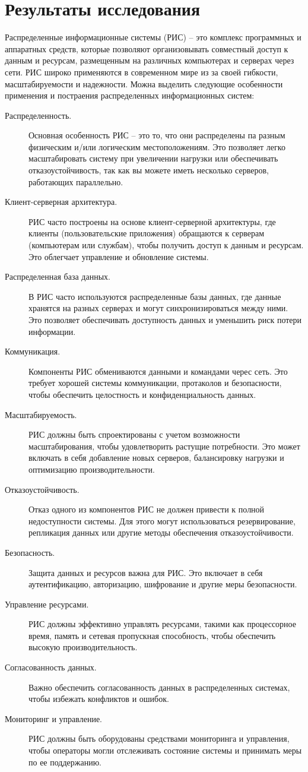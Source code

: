 \documentclass[report, draught]{fefudoc}
\begin{document}
\section{Результаты исследования}
Распределенные информационные системы (РИС) – это комплекс программных и аппаратных средств, которые позволяют организовывать совместный доступ к данным и ресурсам, размещенным на различных компьютерах и серверах через сети. РИС широко применяются в современном мире из за своей гибкости, масштабируемости и надежности. Можна выделить следующие особенности применения и постраения распределенных информационных систем:
\begin{description}
\item[Распределенность.] Основная особенность РИС – это то, что они распределены па разным физическим и/или логическим местоположениям. Это позволяет легко масштабировать систему при увеличении нагрузки или обеспечивать отказоустойчивость, так как вы можете иметь несколько серверов, работающих параллельно.
\item[Клиент-серверная архитектура.] РИС часто построены на основе клиент-серверной архитектуры, где клиенты (пользовательские приложения) обращаются к серверам (компьютерам или службам), чтобы получить доступ к данным и ресурсам. Это облегчает управление и обновление системы.
\item[Распределенная база данных.] В РИС часто используются распределенные базы данных, где данные хранятся на разных серверах и могут синхронизироваться между ними. Это позволяет обеспечивать доступность данных и уменьшить риск потери информации.
\item[Коммуникация.] Компоненты РИС обмениваются данными и командами черес сеть. Это требует хорошей системы коммуникации, протаколов и безопасности, чтобы обеспечить целостность и конфиденциальность данных.
\item[Масштабируемость.] РИС должны быть спроектированы с учетом возможности масштабирования, чтобы удовлетворить растущие потребности. Это может включать в себя добавление новых серверов, балансировку нагрузки и оптимизацию производительности.
\item[Отказоустойчивость.] Отказ одного из компонентов РИС не должен привести к полной недоступности системы. Для этого могут использоваться резервирование, репликация данных или другие методы обеспечения отказоустойчивости.
\item[Безопасность.] Защита данных и ресурсов важна для РИС. Это включает в себя аутентификацию, авторизацию, шифрование и другие меры безопасности.
\item[Управление ресурсами.] РИС должны эффективно управлять ресурсами, такими как процессорное время, память и сетевая пропускная способность, чтобы обеспечить высокую производительность.
\item[Согласованность данных.] Важно обеспечить согласованность данных в распределенных системах, чтобы избежать конфликтов и ошибок.
\item[Мониторинг и управление.] РИС должны быть оборудованы средствами мониторинга и управления, чтобы операторы могли отслеживать состояние системы и принимать меры по ее поддержанию.
\end{description}
\end{document}
